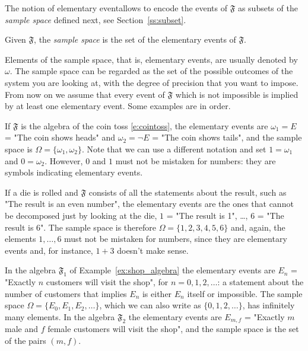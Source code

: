 The notion of elementary eventallows to encode the events of $\mathfrak F$ as subsets of the \emph{sample space} defined next, see Section~\ref{ss:subset}. 
\begin{definition}
	\label{d:sample_space}
	Given $\mathfrak F$, the \emph{sample space} is the set of the elementary events of $\mathfrak F$.
\end{definition}
Elements of the sample space, that is, elementary events, are usually denoted by $\omega$. The sample space can be regarded as the set of the possible outcomes of the system you are looking at, with the degree of precision that you want to impose. From now on we assume that every event of $\mathfrak F$ which is not impossible is implied by at least one elementary event. Some examples are in order. 

\begin{example}
	\label{ex:coin_sample}
	If $\mathfrak F$ is the algebra of the coin toss \eqref{e:cointoss}, the elementary events are $\omega_1 = E$ = "The coin shows heads" and $\omega_2 = \neg E$ = "The coin shows tails", and the sample space is $\Omega = \{\omega_1, \omega_2\}$. Note that we can use a different notation and set $1 = \omega_1$ and $0 = \omega_2$. However, $0$ and $1$ must not be mistaken for numbers: they are symbols indicating elementary events.
\end{example}

\begin{example}
	\label{ex:die_sample}
	If a die is rolled and $\mathfrak F$ consists of all the statements about the result, such as "The result is an even number", the elementary events are the ones that cannot be decomposed just by looking at the die, $1$ = "The result is 1", \ldots, $6$ = "The result is 6". The sample space is therefore $\Omega = \{1,2,3,4,5,6\}$ and, again, the elements $1, \ldots, 6$ must not be mistaken for numbers, since they are elementary events and, for instance, $1 + 3$ doesn't make sense. 
\end{example}

\begin{example}
	\label{ex:shop_sample}
	In the algebra $\mathfrak F_1$ of Example~\ref{ex:shop_algebra} the elementary events are $E_n$ = "Exactly $n$ customers will visit the shop", for $n = 0, 1, 2, \ldots$: a statement about the number of customers that implies $E_n$ is either $E_n$ itself or impossible. The sample space $\Omega = \{E_0, E_1, E_2, \ldots\}$, which we can also write as $\{0, 1, 2, \ldots\}$, has infinitely many elements. In the algebra $\mathfrak F_2$ the elementary events are $E_{m,f}$ = "Exactly $m$ male and $f$ female customers will visit the shop", and the sample space is the set of the pairs $(m,f)$. 
\end{example}

